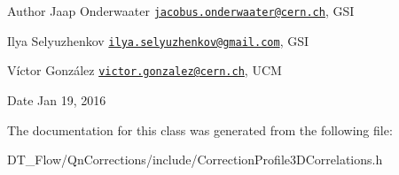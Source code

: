 \begin{DoxyAuthor}{Author}
Jaap Onderwaater \href{mailto:jacobus.onderwaater@cern.ch}{\tt jacobus.\+onderwaater@cern.\+ch}, G\+SI 

Ilya Selyuzhenkov \href{mailto:ilya.selyuzhenkov@gmail.com}{\tt ilya.\+selyuzhenkov@gmail.\+com}, G\+SI 

Víctor González \href{mailto:victor.gonzalez@cern.ch}{\tt victor.\+gonzalez@cern.\+ch}, U\+CM 
\end{DoxyAuthor}
\begin{DoxyDate}{Date}
Jan 19, 2016 
\end{DoxyDate}


The documentation for this class was generated from the following file\+:\begin{DoxyCompactItemize}
\item 
D\+T\+\_\+\+Flow/\+Qn\+Corrections/include/Correction\+Profile3\+D\+Correlations.\+h\end{DoxyCompactItemize}
